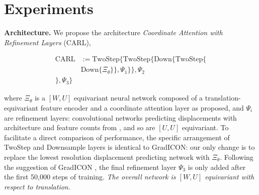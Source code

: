 \section{Experiments}
\label{sec:experiments}
\noindent
\textbf{Architecture.} We propose the architecture \emph{Coordinate Attention with Refinement Layers} (CARL),
\begin{tcolorbox}[top=0mm,bottom=0mm,boxsep=1mm,colback=red!5!white,colframe=red!75!black]
	\begin{align}
		\text{CARL}   & :=\text{TwoStep}\{\text{TwoStep}\{ \text{Down}\{ \text{TwoStep} \{ \nonumber \\
		              & \text{Down} \{  \Xi_\theta\}\}, \Psi_1\}\}, \Psi_2 \nonumber                 \\
		\}, \Psi_3 \} &
		\label{eqn:CARL}
	\end{align}
\end{tcolorbox}
\noindent
where $\Xi_\theta$ is a $[W, U]$ equivariant neural network composed of a
translation-equivariant feature encoder and a coordinate attention layer as proposed, and
$\Psi_i$ are refinement layers: convolutional networks predicting displacements with architecture and feature counts from \cite{greer2021icon, tian2022}, and so are $[U, U]$ equivariant. To facilitate a direct comparison of performance, the specific arrangement of TwoStep and Downsample layers is identical to GradICON: our only change is to replace the lowest resolution displacement predicting network with $\Xi_\theta$. Following the suggestion of GradICON \cite{tian2022}, the final refinement layer $\Psi_3$ is only added after the first 50,000 steps of training. \emph{The overall network is
	$[W, U]$ equivariant with respect to translation.}

